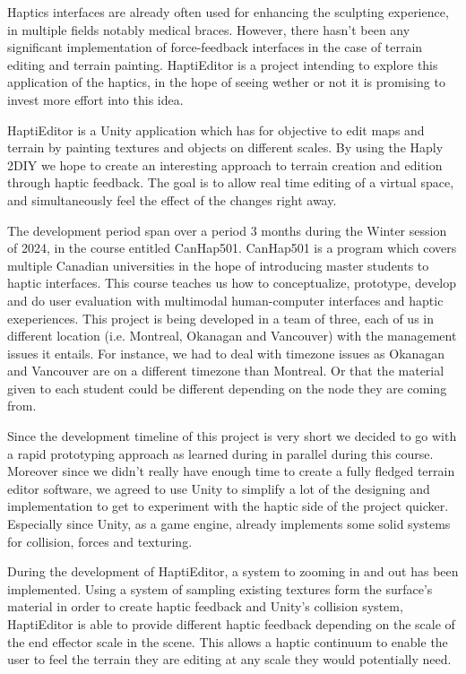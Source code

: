 Haptics interfaces are already often used for enhancing the sculpting experience, in multiple fields notably medical braces.
However, there hasn't been any significant implementation of force-feedback interfaces in the case of terrain editing and terrain painting.
HaptiEditor is a project intending to explore this application of the haptics, in the hope of seeing wether or not it is promising to invest more effort into this idea.

HaptiEditor is a Unity application which has for objective to edit maps and terrain by painting textures and objects on different scales. 
By using the Haply 2DIY we hope to create an interesting approach to terrain creation and edition through haptic feedback.
The goal is to allow real time editing of a virtual space, and simultaneously feel the effect of the changes right away.

The development period span over a period 3 months during the Winter session of 2024, in the course entitled CanHap501.
CanHap501 is a program which covers multiple Canadian universities in the hope of introducing master students to haptic interfaces. 
This course teaches us how to conceptualize, prototype, develop and do user evaluation with multimodal human-computer interfaces and haptic exeperiences.
This project is being developed in a team of three, each of us in different location (i.e. Montreal, Okanagan and Vancouver) with the management issues it entails. 
For instance, we had to deal with timezone issues as Okanagan and Vancouver are on a different timezone than Montreal. 
Or that the material given to each student could be different depending on the node they are coming from.

Since the development timeline of this project is very short we decided to go with a rapid prototyping approach as learned during in parallel during this course.
Moreover since we didn't really have enough time to create a fully fledged terrain editor software,
we agreed to use Unity to simplify a lot of the designing and implementation to get to experiment with the haptic side of the project quicker.
Especially since Unity, as a game engine, already implements some solid systems for collision, forces and texturing.

During the development of HaptiEditor, a system to zooming in and out has been implemented. 
Using a system of sampling existing textures form the surface's material in order to create haptic feedback and Unity's collision system, HaptiEditor is able to provide different haptic feedback depending on the scale of the end effector scale in the scene.
This allows a haptic continuum to enable the user to feel the terrain they are editing at any scale they would potentially need.

